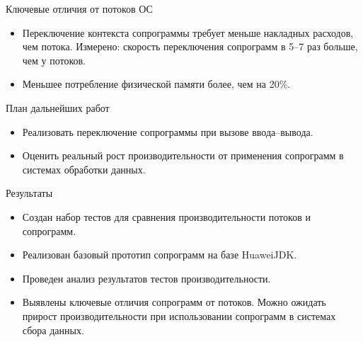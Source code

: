 \begin{frame}{Ключевые отличия от потоков ОС}
	\begin{itemize}
		\item Переключение контекста сопрограммы требует меньше накладных расходов, чем потока. Измерено: скорость переключения сопрограмм в 5--7 раз больше, чем у потоков.
		\item Меньшее потребление физической памяти более, чем на 20\%.
	\end{itemize}
\end{frame}

\begin{frame}{План дальнейших работ} 
	\begin{itemize}
		\item Реализовать переключение сопрограммы при вызове ввода--вывода.
		\item Оценить реальный рост производительности от применения сопрограмм в системах обработки данных.
	\end{itemize}
\end{frame}

\begin{frame}{Результаты}
	\begin{itemize}
		\item Создан набор тестов для сравнения производительности потоков и сопрограмм.
		\item Реализован базовый прототип сопрограмм на базе HuaweiJDK.
		\item Проведен анализ результатов тестов производительности.
		\item Выявлены ключевые отличия сопрограмм от потоков. Можно ожидать прирост
		производительности при использовании сопрограмм в системах сбора данных.
	\end{itemize}
\end{frame}

